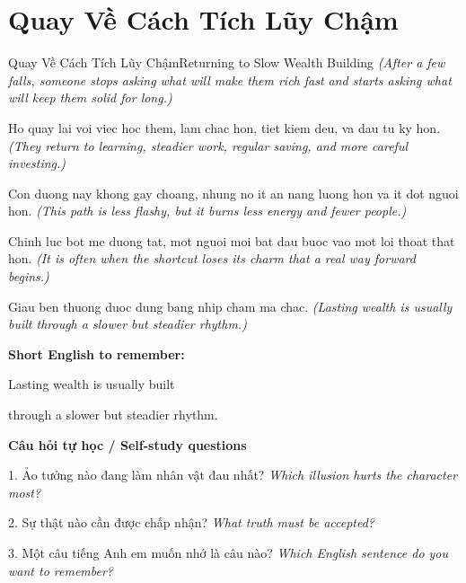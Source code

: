 \section{Quay Về Cách Tích Lũy Chậm}
\begin{truyen}{Quay Về Cách Tích Lũy Chậm}{Returning to Slow Wealth Building}
\textit{(After a few falls, someone stops asking what will make them rich fast and starts asking what will keep them solid for long.)}

Ho quay lai voi viec hoc them, lam chac hon, tiet kiem deu, va dau tu ky hon.
\textit{(They return to learning, steadier work, regular saving, and more careful investing.)}

Con duong nay khong gay choang, nhung no it an nang luong hon va it dot nguoi hon.
\textit{(This path is less flashy, but it burns less energy and fewer people.)}

Chinh luc bot me duong tat, mot nguoi moi bat dau buoc vao mot loi thoat that hon.
\textit{(It is often when the shortcut loses its charm that a real way forward begins.)}

\end{truyen}

\begin{baihoc}
Giau ben thuong duoc dung bang nhip cham ma chac.
\textit{(Lasting wealth is usually built through a slower but steadier rhythm.)}
\end{baihoc}

\begin{ghinhoanh}
\textbf{Short English to remember:}

Lasting wealth is usually built

through a slower but steadier rhythm.

\end{ghinhoanh}

\begin{tuhocnhanh}
\textbf{Câu hỏi tự học / Self-study questions}

1. Ảo tưởng nào đang làm nhân vật đau nhất? \textit{Which illusion hurts the character most?}

2. Sự thật nào cần được chấp nhận? \textit{What truth must be accepted?}

3. Một câu tiếng Anh em muốn nhớ là câu nào? \textit{Which English sentence do you want to remember?}
\end{tuhocnhanh}
